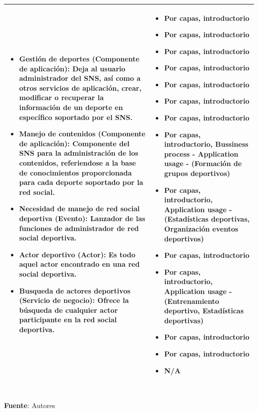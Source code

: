 \begin{table}[!htb]
\begin{center}
{\begin{tabular}{|p{7cm}|p{4cm}|}
\begin{itemize}
				\item \textbf{Gestión de deportes (Componente de aplicación):} Deja al usuario administrador del SNS, así como a otros servicios de aplicación, crear, modificar o recuperar la información de un deporte en específico soportado por el SNS.
				\item \textbf{Manejo de contenidos (Componente de aplicación):} Componente del SNS para la administración de los contenidos, referiendose a la base de conocimientos proporcionada para cada deporte soportado por la red social.
				\item \textbf{Necesidad de manejo de red social deportiva (Evento):} Lanzador de las funciones de administrador de red social deportiva.
				\item \textbf{Actor deportivo (Actor):} Es todo aquel actor encontrado en una red social deportiva.
				\item \textbf{Busqueda de actores deportivos (Servicio de negocio):} Ofrece la búsqueda de cualquier actor participante en la red social deportiva.
			\end{itemize} 
			&
			\begin{itemize}
				\item Por capas, introductorio
				\item Por capas, introductorio
				\item Por capas, introductorio
				\item Por capas, introductorio
				\item Por capas, introductorio
				\item Por capas, introductorio
				\item Por capas, introductorio
				\item Por capas, introductorio, Bussiness process - Application usage - (Formación de grupos deportivos)
				\item Por capas, introductorio, Application usage - (Estadísticas deportivas, Organización eventos deportivos)
				\item Por capas, introductorio
				\item Por capas, introductorio, Application usage - (Entrenamiento deportivo, Estadísticas deportivas)
				\item Por capas, introductorio
				\item Por capas, introductorio
				\item N/A
			\end{itemize} 
			\\
			\hline
		\end{tabular}
		} \\
		\textbf{Fuente}: Autores
	\end{center}
\end{table}

